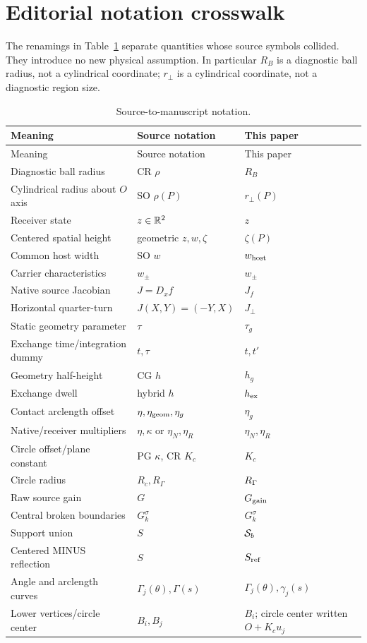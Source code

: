 \section{Editorial notation crosswalk}\label{sec:crosswalk}
The renamings in Table~\ref{tab:notation} separate quantities whose source symbols collided. They introduce no new physical assumption. In particular $R_B$ is a diagnostic ball radius, not a cylindrical coordinate; $r_\perp$ is a cylindrical coordinate, not a diagnostic region size.

\small
\begin{longtable}{@{}>{\raggedright\arraybackslash}p{}>{\raggedright\arraybackslash}p{}>{\raggedright\arraybackslash}p{}@{}}
\caption{Source-to-manuscript notation.}\label{tab:notation}\\
\toprule Meaning & Source notation & This paper\\\midrule\endfirsthead
\toprule Meaning & Source notation & This paper\\\midrule\endhead
Diagnostic ball radius & CR $\rho$ & $R_B$\\
Cylindrical radius about $O$ axis & SO $\rho(P)$ & $r_\perp(P)$\\
Receiver state & $z\in\mathbb R^2$ & $z$\\
Centered spatial height & geometric $z,w,\zeta$ & $\zeta(P)$\\
Common host width & SO $w$ & $w_{\rm host}$\\
Carrier characteristics & $w_\pm$ & $w_\pm$\\
Native source Jacobian & $J=D_xf$ & $J_f$\\
Horizontal quarter-turn & $J(X,Y)=(-Y,X)$ & $J_\perp$\\
Static geometry parameter & $\tau$ & $\tau_g$\\
Exchange time/integration dummy & $t,\tau$ & $t,t'$\\
Geometry half-height & CG $h$ & $h_g$\\
Exchange dwell & hybrid $h$ & $h_{\rm ex}$\\
Contact arclength offset & $\eta,\eta_{\rm geom},\eta_g$ & $\eta_g$\\
Native/receiver multipliers & $\eta,\kappa$ or $\eta_N,\eta_R$ & $\eta_N,\eta_R$\\
Circle offset/plane constant & PG $\kappa$, CR $K_c$ & $K_c$\\
Circle radius & $R_c,R_\Gamma$ & $R_\Gamma$\\
Raw source gain & $G$ & $G_{\rm gain}$\\
Central broken boundaries & $G_k^\sigma$ & $G_k^\sigma$\\
Support union & $S$ & $\mathcal S_b$\\
Centered MINUS reflection & $S$ & $S_{\rm ref}$\\
Angle and arclength curves & $\Gamma_j(\theta),\Gamma(s)$ & $\Gamma_j(\theta),\gamma_j(s)$\\
Lower vertices/circle center & $B_i,B_j$ & $B_i$; circle center written $O+K_cu_j$\\
\bottomrule
\end{longtable}
\normalsize
